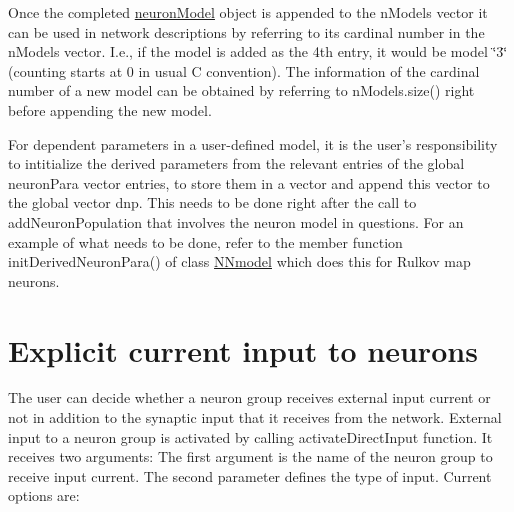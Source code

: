 Once the completed {\ttfamily \hyperlink{structneuronModel}{neuron\+Model}} object is appended to the {\ttfamily n\+Models} vector it can be used in network descriptions by referring to its cardinal number in the n\+Models vector. I.\+e., if the model is added as the 4th entry, it would be model \char`\"{}3\char`\"{} (counting starts at 0 in usual C convention). The information of the cardinal number of a new model can be obtained by referring to {\ttfamily n\+Models.\+size()} right before appending the new model.

For dependent parameters in a user-\/defined model, it is the user's responsibility to intitialize the derived parameters from the relevant entries of the global {\ttfamily neuron\+Para} vector entries, to store them in a vector and append this vector to the global vector {\ttfamily dnp}. This needs to be done right after the call to add\+Neuron\+Population that involves the neuron model in questions. For an example of what needs to be done, refer to the member function {\ttfamily init\+Derived\+Neuron\+Para()} of class {\ttfamily \hyperlink{classNNmodel}{N\+Nmodel}} which does this for Rulkov map neurons.\hypertarget{UserManual_sec_sect_explinput}{}\section{Explicit current input to neurons}\label{UserManual_sec_sect_explinput}
The user can decide whether a neuron group receives external input current or not in addition to the synaptic input that it receives from the network. External input to a neuron group is activated by calling {\ttfamily activate\+Direct\+Input} function. It receives two arguments\+: The first argument is the name of the neuron group to receive input current. The second parameter defines the type of input. Current options are\+:


